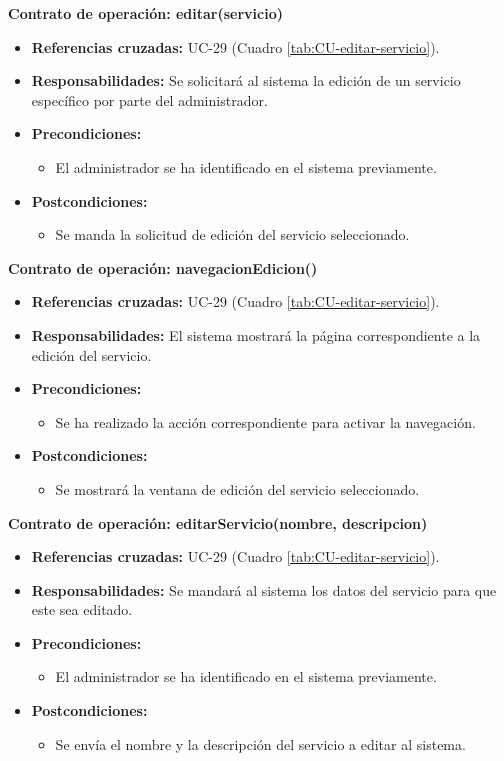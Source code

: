 \textbf{Contrato de operación: editar(servicio)}
\begin{itemize}
\item \textbf{Referencias cruzadas:} UC-29 (Cuadro \ref{tab:CU-editar-servicio}).
\item \textbf{Responsabilidades:} Se solicitará al sistema la edición de un servicio específico por parte del administrador.
\item \textbf{Precondiciones:} 
 \begin{itemize}
\item El administrador se ha identificado en el sistema previamente.
\end {itemize}
\item \textbf{Postcondiciones:} 
 \begin{itemize}
\item Se manda la solicitud de edición del servicio seleccionado.
\end {itemize}
\end {itemize}

\textbf{Contrato de operación: navegacionEdicion()}
\begin{itemize}
\item \textbf{Referencias cruzadas:} UC-29 (Cuadro \ref{tab:CU-editar-servicio}).
\item \textbf{Responsabilidades:} El sistema mostrará la página correspondiente a la edición del servicio.
\item \textbf{Precondiciones:} 
 \begin{itemize}
\item Se ha realizado la acción correspondiente para activar la navegación.
\end {itemize}
\item \textbf{Postcondiciones:} 
 \begin{itemize}
\item Se mostrará la ventana de edición del servicio seleccionado.
\end {itemize}
\end {itemize}

\textbf{Contrato de operación: editarServicio(nombre, descripcion)}
\begin{itemize}
\item \textbf{Referencias cruzadas:} UC-29 (Cuadro \ref{tab:CU-editar-servicio}).
\item \textbf{Responsabilidades:} Se mandará al sistema los datos del servicio para que este sea editado.
\item \textbf{Precondiciones:} 
 \begin{itemize}
\item El administrador se ha identificado en el sistema previamente.
\end {itemize}
\item \textbf{Postcondiciones:} 
 \begin{itemize}
\item Se envía el nombre y la descripción del servicio a editar al sistema.
\end {itemize}
\end {itemize}


